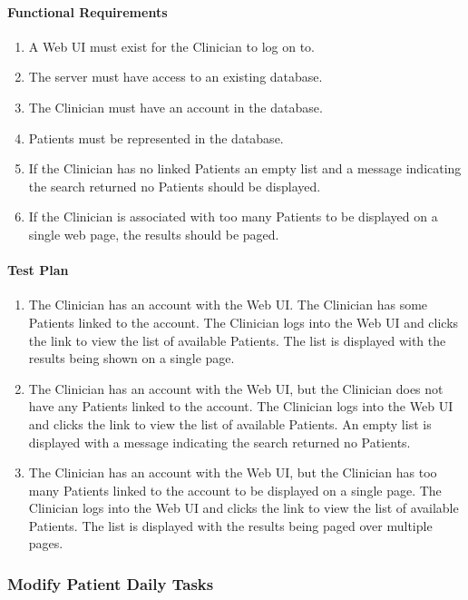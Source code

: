 \documentclass{article}
\begin{document}
\paragraph{Functional Requirements}
\begin{enumerate}
\item A Web UI must exist for the Clinician to log on to. 
\item The server must have access to an existing database.
\item The Clinician must have an account in the database.
\item Patients must be represented in the database.
\item If the Clinician has no linked Patients an empty list and a message indicating the search returned no Patients should be displayed. 
\item If the Clinician is associated with too many Patients to be displayed on a single web page, the results should be paged.
\end{enumerate}

\paragraph{Test Plan}
\begin{enumerate}
\item The Clinician has an account with the Web UI. The Clinician has some Patients linked to the account. The Clinician logs into the Web UI and clicks the link to view the list of available Patients. The list is displayed with the results being shown on a single page.
\item The Clinician has an account with the Web UI, but the Clinician does not have any Patients linked to the account.  The Clinician logs into the Web UI and clicks the link to view the list of available Patients. An empty list is displayed with a message indicating the search returned no Patients.
\item The Clinician has an account with the Web UI, but the Clinician has too many Patients linked to the account to be displayed on a single page.  The Clinician logs into the Web UI and clicks the link to view the list of available Patients. The list is displayed with the results being paged over multiple pages.
\end{enumerate}


\subsubsection{Modify Patient Daily Tasks}\label{sec: Mod Daily Task}
\end{document}
